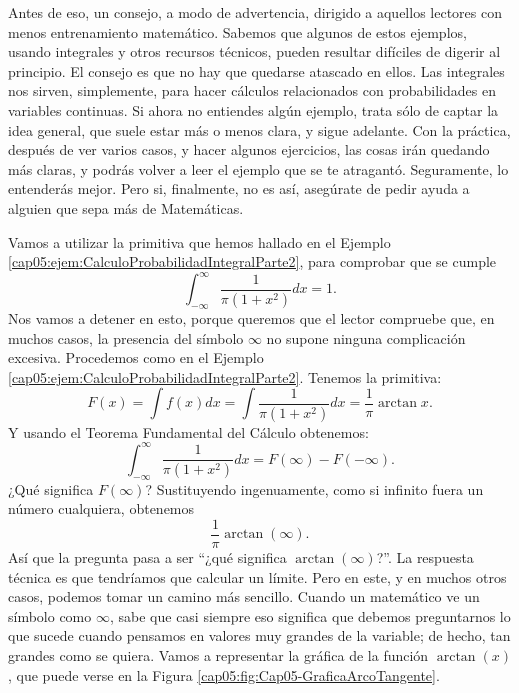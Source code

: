 Antes de eso, un consejo, a modo de advertencia, dirigido a aquellos lectores con menos entrenamiento matemático. Sabemos que algunos de estos ejemplos, usando integrales y otros recursos técnicos, pueden resultar difíciles de digerir al principio. El consejo es que no hay que quedarse atascado en ellos. Las integrales nos sirven, simplemente, para hacer cálculos relacionados con probabilidades en variables continuas. Si ahora no entiendes algún ejemplo, trata sólo de captar la idea general, que suele estar más o menos clara, y sigue adelante. Con la práctica, después de ver varios casos, y hacer algunos ejercicios, las cosas irán quedando más claras, y podrás volver a leer el ejemplo que se te atragantó. Seguramente, lo entenderás mejor. Pero si, finalmente, no es así, asegúrate de pedir ayuda a alguien que sepa más de Matemáticas.
\begin{ejemplo}
\label{cap05:ejem:DistribucionCauchyIntegralTotal1}
    Vamos a utilizar la primitiva que hemos hallado en el Ejemplo \ref{cap05:ejem:CalculoProbabilidadIntegralParte2}, para comprobar que se cumple
    \[\int_{-\infty}^{\infty}\dfrac{1}{\pi(1+x^2)}dx=1.\]
    Nos vamos a detener en esto, porque queremos que el lector compruebe que, en muchos casos, la presencia del símbolo $\infty$ no supone ninguna complicación excesiva. Procedemos como en el Ejemplo \ref{cap05:ejem:CalculoProbabilidadIntegralParte2}. Tenemos la primitiva:
    \[F(x)=\int f(x)dx=\int \frac{1}{\pi(1+x^2)} dx = \dfrac{1}{\pi}\arctan x.\]
    Y usando el Teorema Fundamental del Cálculo obtenemos:
    \[\int_{-\infty}^{\infty}\dfrac{1}{\pi(1+x^2)}dx=F(\infty)-F(-\infty).\]
    ¿Qué significa $F(\infty)$? Sustituyendo ingenuamente, como si infinito fuera un número cualquiera, obtenemos
    \[\dfrac{1}{\pi}\arctan(\infty).\]
    Así que la pregunta pasa a ser ``¿qué significa $\arctan(\infty)$?''. La respuesta técnica es que tendríamos que calcular un límite. Pero en este, y en muchos otros casos, podemos tomar un camino más sencillo. Cuando un matemático ve un símbolo como $\infty$, sabe que casi siempre eso significa que debemos preguntarnos lo que sucede cuando pensamos en valores muy grandes de la variable; de hecho, tan grandes como se quiera. Vamos a representar la gráfica de la función $\arctan(x)$, que puede verse en la Figura \ref{cap05:fig:Cap05-GraficaArcoTangente}.


\end{ejemplo}
